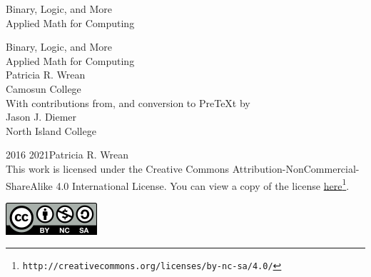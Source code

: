 \documentclass[twoside,10pt,]{book}
\newcommand{\titlepagefont}{\relax}
\numberwithin{equation}{section}
\begin{document}
\raggedbottom
\frontmatter
\thispagestyle{empty}
{\titlepagefont\centering
\vspace*{0.28\textheight}
{\Huge Binary, Logic, and More}\\[2\baselineskip]
{\LARGE Applied Math for Computing}\\
}
\clearpage
\thispagestyle{empty}
\null%
\clearpage
\thispagestyle{empty}
{\titlepagefont\centering
\vspace*{0.14\textheight}
{\Huge Binary, Logic, and More}\\[\baselineskip]
{\LARGE Applied Math for Computing}\\[3\baselineskip]
{\Large Patricia R. Wrean}\\[0.5\baselineskip]
{\Large Camosun College}\\[3\baselineskip]
{\Large With contributions from, and conversion to PreTeXt by}\\[0.5\baselineskip]
{\normalsize Jason J. Diemer}\\[0.25\baselineskip]
North Island College\\
}
\clearpage
\thispagestyle{empty}
\label{g:colophon:idp25373800}{}\hypertarget{g:colophon:idp25373800}{}
\noindent\textcopyright{}2016 \textendash{} 2021\quad{}Patricia R. Wrean\\[0.5\baselineskip]
This work is licensed under the Creative Commons Attribution-NonCommercial-ShareAlike 4.0 International License. You can view a copy of the license \href{http://creativecommons.org/licenses/by-nc-sa/4.0/}{here}\footnote{\nolinkurl{http://creativecommons.org/licenses/by-nc-sa/4.0/}\label{g:fn:idp25381224}}. \begin{image}{0.375}{0.25}{0.375}%
\includegraphics[width=\linewidth]{./external/images/by-nc-sa.png}
\end{image}%
\end{document}

